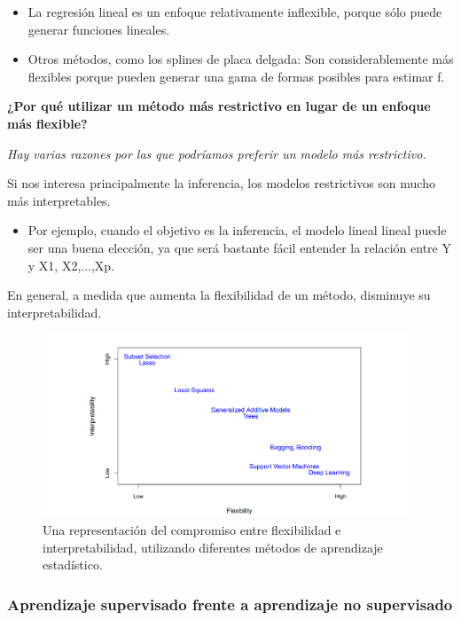 \documentclass[
  letterpaper,
  DIV=11,
  numbers=noendperiod]{scrartcl}
\providecommand{\tightlist}{%
  \setlength{\itemsep}{0pt}\setlength{\parskip}{0pt}}\usepackage{longtable,booktabs,array}
\begin{document}
\begin{itemize}
\item
  La regresión lineal es un enfoque relativamente inflexible, porque
  sólo puede generar funciones lineales.
\item
  Otros métodos, como los splines de placa delgada: Son
  considerablemente más flexibles porque pueden generar una gama de
  formas posibles para estimar f.
\end{itemize}

\textbf{¿Por qué utilizar un método más restrictivo en lugar de un
enfoque más flexible?}

\emph{Hay varias razones por las que podríamos preferir un modelo más
restrictivo.}

Si nos interesa principalmente la inferencia, los modelos restrictivos
son mucho más interpretables.

\begin{itemize}
\tightlist
\item
  Por ejemplo, cuando el objetivo es la inferencia, el modelo lineal
  lineal puede ser una buena elección, ya que será bastante fácil
  entender la relación entre Y y X1, X2,...,Xp.
\end{itemize}

En general, a medida que aumenta la flexibilidad de un método, disminuye
su interpretabilidad.

\begin{figure}

{\centering \includegraphics[width=4.29167in,height=\textheight]{images/figura3.png}

}

\caption{Una representación del compromiso entre flexibilidad e
interpretabilidad, utilizando diferentes métodos de aprendizaje
estadístico.}

\end{figure}

\hypertarget{aprendizaje-supervisado-frente-a-aprendizaje-no-supervisado}{%
\subsubsection{\texorpdfstring{\textbf{Aprendizaje supervisado frente a
aprendizaje no
supervisado}}{Aprendizaje supervisado frente a aprendizaje no supervisado}}\label{aprendizaje-supervisado-frente-a-aprendizaje-no-supervisado}}
\end{document}
